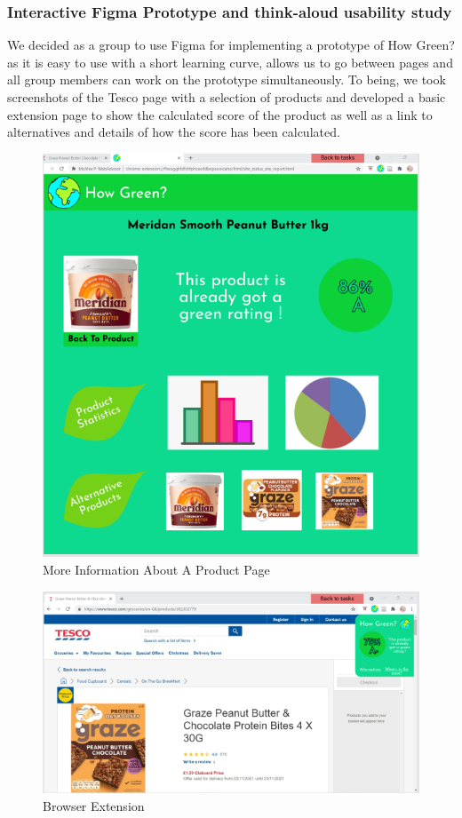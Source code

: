 \documentclass[a4,10pt,twocolumn]{article}
\begin{document}
\subsubsection*{Interactive Figma Prototype and think-aloud usability study}

We decided as a group to use Figma for implementing a prototype of How Green? as it is easy to use with a short learning curve, allows us to go between pages and all group members can work on the prototype simultaneously. To being, we took screenshots of the Tesco page with a selection of products and developed a basic extension page to show the calculated score of the product as well as a link to alternatives and details of how the score has been calculated.
\begin{figure}[h]
    \centering
    \includegraphics[width=0.9\columnwidth]{assets/prototype/figma.PNG}
    \caption{More Information About A Product Page}
\end{figure}

\begin{figure}[h]
    \centering
    \includegraphics[width=0.9\columnwidth]{assets/prototype/figma_extension.PNG}
    \caption{Browser Extension}
\end{figure}
\end{document}
